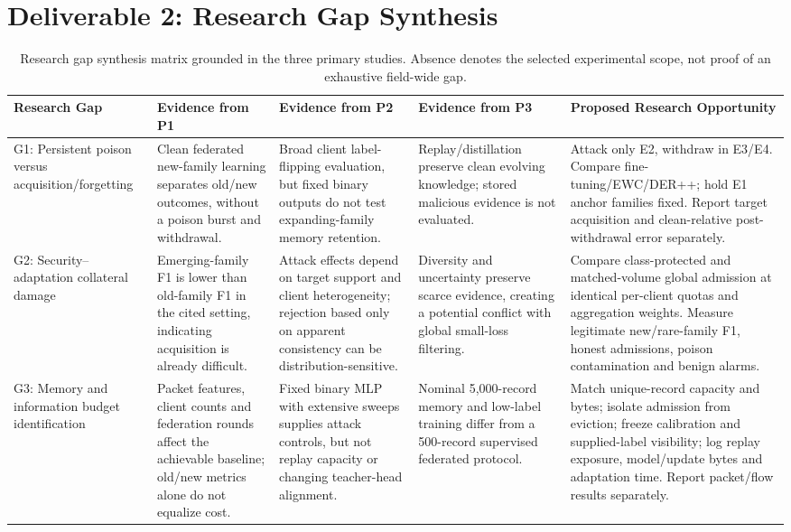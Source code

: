 \documentclass[10pt,a4paper]{article}
\begin{document}
\section{Deliverable 2: Research Gap Synthesis}
\begin{landscape}
\begin{table}[p]
\centering\footnotesize
\caption{Research gap synthesis matrix grounded in the three primary studies. Absence denotes the selected experimental scope, not proof of an exhaustive field-wide gap.}
\label{tab:gaps}
\begin{tabular}{L{3.0cm}L{4.5cm}L{4.5cm}L{4.5cm}L{5.4cm}}
\toprule
Research Gap & Evidence from P1 \cite{carillo} & Evidence from P2 \cite{lavaur} & Evidence from P3 \cite{guo} & Proposed Research Opportunity\\
\midrule
G1: Persistent poison versus acquisition/forgetting
& Clean federated new-family learning separates old/new outcomes, without a poison burst and withdrawal.
& Broad client label-flipping evaluation, but fixed binary outputs do not test expanding-family memory retention.
& Replay/distillation preserve clean evolving knowledge; stored malicious evidence is not evaluated.
& Attack only E2, withdraw in E3/E4. Compare fine-tuning/EWC/DER++; hold E1 anchor families fixed. Report target acquisition and clean-relative post-withdrawal error separately.\\[7pt]
G2: Security--adaptation collateral damage
& Emerging-family F1 is lower than old-family F1 in the cited setting, indicating acquisition is already difficult.
& Attack effects depend on target support and client heterogeneity; rejection based only on apparent consistency can be distribution-sensitive.
& Diversity and uncertainty preserve scarce evidence, creating a potential conflict with global small-loss filtering.
& Compare class-protected and matched-volume global admission at identical per-client quotas and aggregation weights. Measure legitimate new/rare-family F1, honest admissions, poison contamination and benign alarms.\\[7pt]
G3: Memory and information budget identification
& Packet features, client counts and federation rounds affect the achievable baseline; old/new metrics alone do not equalize cost.
& Fixed binary MLP with extensive sweeps supplies attack controls, but not replay capacity or changing teacher-head alignment.
& Nominal 5,000-record memory and low-label training differ from a 500-record supervised federated protocol.
& Match unique-record capacity and bytes; isolate admission from eviction; freeze calibration and supplied-label visibility; log replay exposure, model/update bytes and adaptation time. Report packet/flow results separately.\\
\bottomrule
\end{tabular}
\end{table}
\end{landscape}
\end{document}
